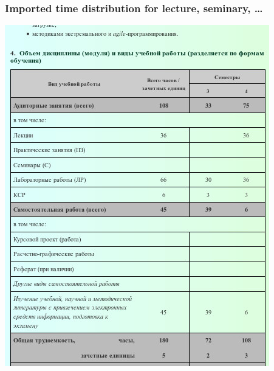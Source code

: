 \documentclass[10pt]{beamer}
\begin{document}
\begin{frame}
  \frametitle{Imported time distribution for lecture, seminary, \ldots}
   \begin{adjustwidth}{-2.5em}{-2.5em}
    \begin{center}
      \includegraphics[width=0.9\linewidth]{work-program-volume.jpg}
    \end{center}
  \end{adjustwidth}
\end{frame}
\end{document}
